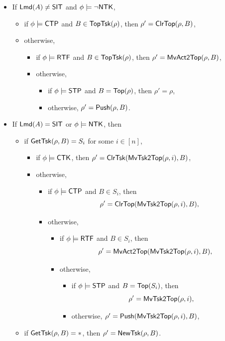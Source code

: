 \medskip

\noindent {}
\begin{itemize}
	\item If ${\sf Lmd}(A) \neq {\sf SIT}$ and $\phi \models \neg {\sf NTK}$, 
	\begin{itemize}
		\item if $\phi \models{\sf CTP}$ and $B \in \mathsf{TopTsk}(\rho)$, then $\rho' =\mathsf{ClrTop}(\rho, B)$,
		\item otherwise,
		\begin{itemize}
			\item if $\phi \models {\sf RTF}$ and $B \in \mathsf{TopTsk}(\rho)$, then $\rho'=\mathsf{MvAct2Top}(\rho, B)$,
			\item otherwise,
			\begin{itemize}
				\item if $\phi \models {\sf STP}$ and $B = \mathsf{Top}(\rho)$, then $\rho' = \rho$,
				\item otherwise, $\rho' = \mathsf{Push}(\rho, B)$.
			\end{itemize}
		\end{itemize}
	\end{itemize}
	\item If ${\sf Lmd}(A) = {\sf SIT}$ or $\phi \models {\sf NTK}$, then
	\begin{itemize}
		\item if $\mathsf{GetTsk}(\rho, B) = S_i$ for some $i\in[n]$,
		\begin{itemize}
			\item if $\phi \models{\sf CTK}$, then $\rho' = \mathsf{ClrTsk}(\mathsf{MvTsk2Top}(\rho, i), B)$,
			\item otherwise, 
			\begin{itemize}
				\item if $\phi \models {\sf CTP}$ and $B \in S_i$, then 
				$$\rho' =\mathsf{ClrTop}(\mathsf{MvTsk2Top}(\rho, i), B),$$
				\item otherwise,
				\begin{itemize}
					\item if $\phi \models {\sf RTF}$ and $B \in S_i$, then 
					$$\rho'=\mathsf{MvAct2Top}(\mathsf{MvTsk2Top}(\rho, i), B),$$
					\item otherwise,
					\begin{itemize}
						\item if $\phi \models {\sf STP}$ and $B = \mathsf{Top}(S_i)$, then 
						$$\rho' = \mathsf{MvTsk2Top}(\rho, i),$$
						\item otherwise, $\rho'=\mathsf{Push}(\mathsf{MvTsk2Top}(\rho, i), B)$,
					\end{itemize}
				\end{itemize}
			\end{itemize}
		\end{itemize}
		\item if $\mathsf{GetTsk}(\rho, B) = *$, then $\rho' = \mathsf{NewTsk}(\rho, B)$.
	\end{itemize}
\end{itemize}

